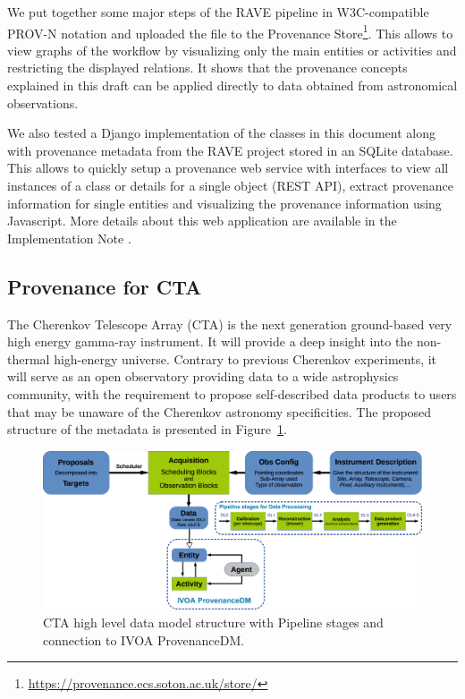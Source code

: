 We put together some major steps of the RAVE pipeline in W3C-compatible PROV-N notation
and uploaded the file to the Provenance Store\footnote{\url{https://provenance.ecs.soton.ac.uk/store/}}. This allows to view graphs of the workflow by visualizing only the main entities or activities and restricting the displayed relations. It shows that the provenance concepts explained in this draft can be applied directly to data obtained from astronomical observations.

We also tested a Django implementation of the classes in this document along with provenance metadata from the RAVE project stored in an SQLite database. This allows to quickly setup a provenance web service with interfaces to view all instances of a class or details for a single object (REST API), extract provenance information for single entities and visualizing the provenance information using Javascript. More details about this web application are available in the Implementation Note \citep{std:ProvenanceImplementationNote}.

\subsection{Provenance for CTA}
The Cherenkov Telescope Array (CTA) is the next generation ground-based very high energy gamma-ray instrument. It will provide a deep insight into the non-thermal high-energy universe. Contrary to previous Cherenkov experiments, it will serve as an open observatory providing data to a wide astrophysics community, with the requirement to propose self-described data products to users that may be unaware of the Cherenkov astronomy specificities. The proposed structure of the metadata is presented in Figure~\ref{fig:cta_dm}.

\begin{figure}
\centering
\includegraphics[width=\textwidth]{CTA_DM_high_level.png}
\caption[CTA high level data model structure]{CTA high level data model structure with Pipeline stages and connection to IVOA ProvenanceDM.}
\label{fig:cta_dm}
\end{figure}

